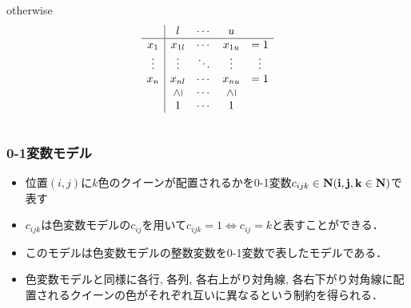 \begin{frame}
\begin{columns}
\begin{column}{0.5\textwidth}
    \begin{exampleblock}{otherwise}
        \begin{displaymath}
        \begin{array}{c|cccc}
                & l      & \cdots & u      &       \\\hline
         x_1    & x_{1l} & \cdots & x_{1u} & =1    \\
         \vdots & \vdots & \ddots & \vdots & \vdots\\
         x_n    & x_{nl} & \cdots & x_{nu} & =1    \\
                & \rgeq  & \cdots & \rgeq  &       \\
                & 1      & \cdots & 1      &
        \end{array}
        \end{displaymath}
    \end{exampleblock}
        \end{column}
    \end{columns}
\end{frame}
\begin{frame}\small
    \frametitle{0-1変数モデル}
    \setlength{\abovedisplayskip}{1pt} %
    \setlength{\belowdisplayskip}{1pt} %
    \begin{block}{}
        \begin{itemize}
            \item 位置$(i, j)$に$k$色のクイーンが配置されるかを0-1変数$c_{ijk} \in \bf N (i, j, k \in \bf N)$で表す
            \item $c_{ijk}$は色変数モデルの$c_{ij}$を用いて$c_{ijk}=1 \Leftrightarrow c_{ij}=k$と表すことができる．
            \item このモデルは色変数モデルの整数変数を0-1変数で表したモデルである．
            \item 色変数モデルと同様に\alert{各行}, \alert{各列}, \alert{各右上がり対角線}, \alert{各右下がり対角線}に配置されるクイーンの色がそれぞれ互いに異なるという制約を得られる．
        \end{itemize}
    \end{block}
\end{frame}
